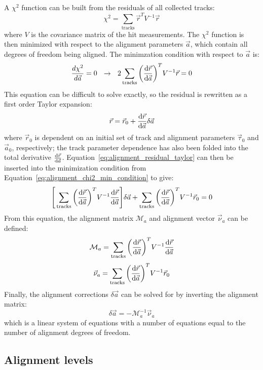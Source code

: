 A $\chi^2$ function can be built from the residuals of all collected tracks:
\begin{equation}
  \chi^2 = \sum\limits_{\textrm{tracks}}\vec{r}^{T}V^{-1}\vec{r}
  \label{eq:alignment_chi2}
\end{equation}
where $V$ is the covariance matrix of the hit measurements.
The $\chi^2$ function is then minimized with respect to the alignment parameters $\vec{a}$, which contain all degrees of freedom being aligned.
The minimzation condition with respect to $\vec{a}$ is:
\begin{equation}
  \frac{d\chi^2}{d\vec{a}} = 0 ~~ \rightarrow ~~ 2\sum\limits_{\textrm{tracks}}\bigg(\deriv{\vec{r}}{\vec{a}}\bigg)^{T}V^{-1}\vec{r} = 0
  \label{eq:alignment_chi2_min_condition}
\end{equation}
This equation can be difficult to solve exactly, so the residual is rewritten as a first order Taylor expansion:
\begin{equation}
  \vec{r} = \vec{r}_0+\deriv{\vec{r}}{\vec{a}}\delta\vec{a}
  \label{eq:alignment_residual_taylor}
\end{equation}
where $\vec{r}_0$ is dependent on an initial set of track and alignment parameters $\vec{\tau}_0$ and $\vec{a}_0$, respectively; the track parameter dependence has also been folded into the total derivative $\frac{\textrm{d}\vec{r}}{\textrm{d}\vec{a}}$.
Equation~\ref{eq:alignment_residual_taylor} can then be inserted into the minimization condition from Equation~\ref{eq:alignment_chi2_min_condition} to give:
\begin{equation}
  \Bigg[ \sum\limits_{\textrm{tracks}}\bigg(\deriv{\vec{r}}{\vec{a}}\bigg)^{T}V^{-1}\deriv{\vec{r}}{\vec{a}} \Bigg]\delta\vec{a} + \sum\limits_{\textrm{tracks}}\bigg(\deriv{\vec{r}}{\vec{a}}\bigg)^{T}V^{-1}\vec{r}_0 = 0
  \label{eq:alignment_chi2_min_taylor}
\end{equation}
From this equation, the alignment matrix $\mathcal{M}_a$ and alignment vector $\vec{\nu}_a$ can be defined:
\begin{equation}
  \mathcal{M}_a = \sum\limits_{\textrm{tracks}}\bigg(\deriv{\vec{r}}{\vec{a}}\bigg)^{T}V^{-1}\deriv{\vec{r}}{\vec{a}}
  \label{eq:alignment_matrix}
\end{equation}
\begin{equation}
  \vec{\nu}_a = \sum\limits_{\textrm{tracks}}\bigg(\deriv{\vec{r}}{\vec{a}}\bigg)^{T}V^{-1}\vec{r}_0
  \label{eq:alignment_vector}
\end{equation}
Finally, the alignment corrections $\delta\vec{a}$ can be solved for by inverting the alignment matrix:
\begin{equation}
  \delta\vec{a} = -\mathcal{M}_a^{-1}\vec{\nu}_a
  \label{eq:alignment_corrections}
\end{equation}
which is a linear system of equations with a number of equations equal to the number of alignment degrees of freedom.



\subsection{Alignment levels}\label{align:levels}

